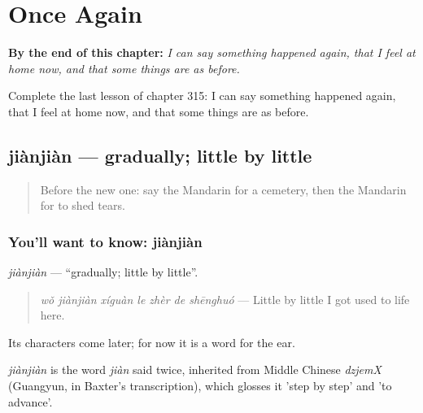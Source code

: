 
\chapter{Once Again}
\label{ch:zh-once-again}

\begin{chapteropening}
\textbf{By the end of this chapter:} \emph{I can say something happened again, that I feel at home now, and that some things are as before.}

Complete the last lesson of chapter 315: I can say something happened again, that I feel at home now, and that some things are as before.
\end{chapteropening}

\section[jiànjiàn]{jiànjiàn — gradually; little by little}

\label{lesson:ZH-C315-jianjian}



\begin{quote}
Before the new one: say the Mandarin for a cemetery, then the Mandarin for to shed tears.
\end{quote}

\subsection*{You'll want to know: jiànjiàn}
\emph{jiànjiàn} — \textquotedblleft{}gradually; little by little\textquotedblright{}.

\begin{quote}
\emph{wǒ jiànjiàn xíguàn le zhèr de shēnghuó} — Little by little I got used to life here.
\end{quote}

Its characters come later; for now it is a word for the ear.

\begin{cousinweb}
\emph{jiànjiàn} is the word \emph{jiàn} said twice, inherited from Middle Chinese \emph{dzjemX} (Guangyun, in Baxter's transcription), which glosses it 'step by step' and 'to advance'.
\end{cousinweb}

